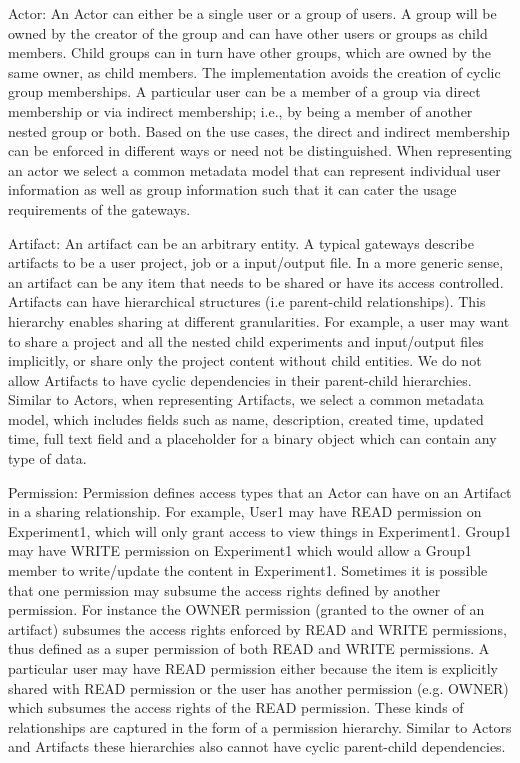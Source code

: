 \documentclass[sigconf]{acmart}
\begin{document}
Actor: An Actor can either be a single user or a group of users. A group will be owned by the creator of the group and can have other users or groups as child members. Child groups can in turn have other groups, which are owned by the same owner, as child members. The implementation avoids the creation of cyclic group memberships. A particular user can be a member of a group via direct membership or via indirect membership; i.e., by being a member of another nested group or both. Based on the use cases, the direct and indirect membership can be enforced in different ways or need not be distinguished. When representing an actor we select a common metadata model that can represent individual user information as well as group information such that it can cater the usage requirements of the gateways.

Artifact: An artifact can be an arbitrary entity. A typical gateways describe artifacts to be a user project, job or a input/output file. In a more generic sense, an artifact can be any item that needs to be shared or have its access controlled. Artifacts can have hierarchical structures (i.e parent-child relationships). This hierarchy enables sharing at different granularities. For example, a user may want to share a project and all the nested child experiments and input/output files implicitly, or share only the project content without child entities. We do not allow Artifacts to have cyclic dependencies in their parent-child hierarchies. Similar to Actors, when representing Artifacts, we select a common metadata model, which includes fields such as name, description, created time, updated time, full text field and a placeholder for a binary object which can contain any type of data.

Permission: Permission defines access types that an Actor can have on an Artifact in a sharing relationship. For example, User1 may have READ permission on Experiment1, which will only grant access to view things in Experiment1. Group1 may have WRITE permission on Experiment1 which would allow a Group1 member to write/update the content in Experiment1. Sometimes it is possible that one permission may subsume the access rights defined by another permission. For instance the OWNER permission (granted to the owner of an artifact) subsumes the access rights enforced by READ and WRITE permissions, thus defined as a super permission of both READ and WRITE permissions. A particular user may have READ permission either because the item is explicitly shared with READ permission or the user has another permission (e.g. OWNER) which subsumes the access rights of the READ permission. These kinds of relationships are captured in the form of a permission hierarchy. Similar to Actors and Artifacts these hierarchies also cannot have cyclic parent-child dependencies.
\end{document}
